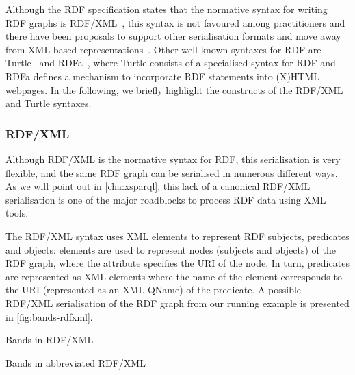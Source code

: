 Although the \ac{RDF} specification states that the normative syntax for writing \ac{RDF} graphs is
RDF/XML~\cite{BeckettMcBride:2004aa}, this syntax is not favoured among practitioners and there have been proposals to
support other serialisation formats and move away from \ac{XML} based representations~\cite{Beckett:2010aa}.
% 
Other well known syntaxes for \ac{RDF} are Turtle~\cite{BeckettBerners-Lee:2008aa} and RDFa~\cite{AdidaBirbeck:2008aa},
where Turtle consists of a specialised syntax for RDF and RDFa defines a mechanism to incorporate \ac{RDF} statements into
(X)HTML webpages.
%
In the following, we briefly highlight the constructs of the RDF/XML and Turtle syntaxes.


\subsubsection{RDF/XML}
\label{sec:rdfxml}

Although RDF/XML is the normative syntax for \ac{RDF}, this serialisation is very flexible, and the same \ac{RDF} graph can
be serialised in numerous different ways.
%
As we will point out in \cref{cha:xsparql}, this lack of a canonical RDF/XML serialisation is one of the major
roadblocks to process \ac{RDF} data using \ac{XML} tools.
%


%
The RDF/XML syntax uses \ac{XML} elements to represent \ac{RDF} subjects, predicates and objects:
 elements are used to represent nodes (subjects and objects) of the \ac{RDF}
graph, where the  attribute specifies the URI of the node.
%
In turn, predicates are represented as \ac{XML} elements where the name of the element corresponds to the \ac{URI}
(represented as an \ac{XML} QName) of the predicate.
%
A possible RDF/XML serialisation of the \ac{RDF} graph from our running example is presented in
\cref{fig:bands-rdfxml}.
%
\begin{data}[p]
  \centering
  
  \caption{Bands in RDF/XML}
  \label{fig:bands-rdfxml}
\end{data}
%
\begin{data}[t]
  \centering
  
  \caption{Bands in abbreviated RDF/XML}
\label{fig:bands-rdfxml-abbrev}
\end{data}


